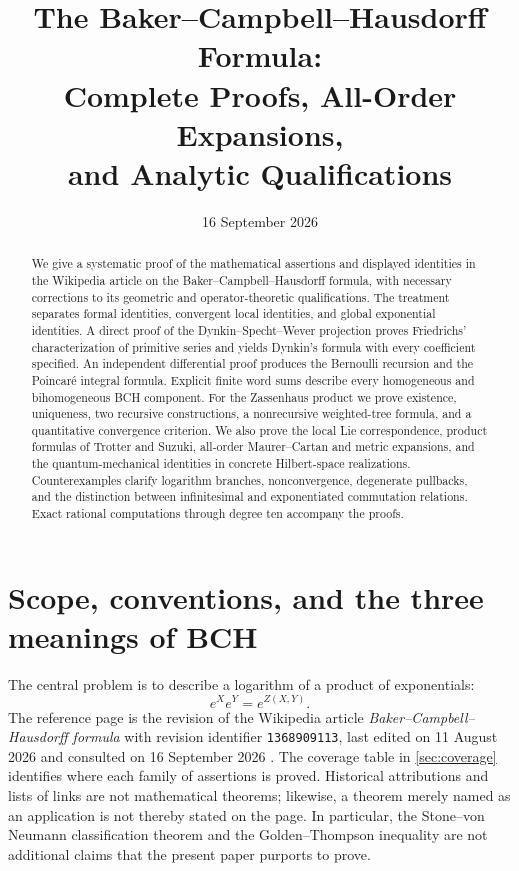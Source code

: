 \documentclass[11pt]{article}
\title{The Baker--Campbell--Hausdorff Formula:\\
 Complete Proofs, All-Order Expansions,\\and Analytic Qualifications}
\author{}
\date{16 September 2026}
\numberwithin{equation}{section}
\theoremstyle{definition}
\theoremstyle{remark}
\begin{document}
\maketitle
\begin{abstract}
We give a systematic proof of the mathematical assertions and displayed
identities in the Wikipedia article on the Baker--Campbell--Hausdorff formula,
with necessary corrections to its geometric and operator-theoretic
qualifications. The treatment separates formal identities, convergent local
identities, and global exponential identities. A direct proof of the
Dynkin--Specht--Wever projection proves Friedrichs' characterization of
primitive series and yields Dynkin's formula with every coefficient specified.
An independent differential proof produces the Bernoulli recursion and the
Poincar\'e integral formula. Explicit finite word sums describe every
homogeneous and bihomogeneous BCH component. For the Zassenhaus product we
prove existence, uniqueness, two recursive constructions, a nonrecursive
weighted-tree formula, and a quantitative convergence criterion. We also
prove the local Lie correspondence, product formulas of Trotter and Suzuki,
all-order Maurer--Cartan and metric expansions, and the quantum-mechanical
identities in concrete Hilbert-space realizations. Counterexamples clarify
logarithm branches, nonconvergence, degenerate pullbacks, and the distinction
between infinitesimal and exponentiated commutation relations. Exact rational
computations through degree ten accompany the proofs.
\end{abstract}
\begingroup
\small
\setlength{\parskip}{0pt}
\tableofcontents
\endgroup
\newpage

\section{Scope, conventions, and the three meanings of BCH}\label{sec:scope}
The central problem is to describe a logarithm of a product of exponentials:
\begin{equation}\label{eq:main}
 e^X e^Y=e^{Z(X,Y)}.
\end{equation}
The reference page is the revision of the Wikipedia article
\emph{Baker--Campbell--Hausdorff formula} with revision identifier
\texttt{1368909113}, last edited on 11 August 2026 and consulted on
16 September 2026 \cite{wiki}. The coverage table in
\cref{sec:coverage} identifies where each family of assertions is proved.
Historical attributions and lists of links are not mathematical theorems;
likewise, a theorem merely named as an application is not thereby stated on
the page. In particular, the Stone--von Neumann classification theorem and
the Golden--Thompson inequality are not additional claims that the present
paper purports to prove.
\end{document}
